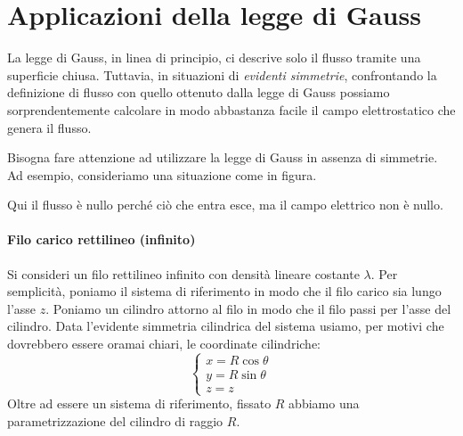 \section{Applicazioni della legge di Gauss}
La legge di Gauss, in linea di principio, ci descrive solo il flusso tramite una superficie chiusa. Tuttavia, in situazioni di \textit{evidenti simmetrie}, confrontando la definizione di flusso con quello ottenuto dalla legge di Gauss possiamo sorprendentemente calcolare in modo abbastanza facile il campo elettrostatico che genera il flusso.
\begin{attention} %
	Bisogna fare attenzione ad utilizzare la legge di Gauss in assenza di simmetrie. Ad esempio, consideriamo una situazione come in figura.
	
	Qui il flusso è nullo perché ciò che entra esce, ma il campo elettrico non è nullo.
\end{attention}
\paragraph{Filo carico rettilineo (infinito)}
	Si consideri un filo rettilineo infinito con densità lineare costante $\lambda$. Per semplicità, poniamo il sistema di riferimento in modo che il filo carico sia lungo l'asse $z$. Poniamo un cilindro attorno al filo in modo che il filo passi per l'asse del cilindro. Data l'evidente simmetria cilindrica del sistema usiamo, per motivi che dovrebbero essere oramai chiari, le coordinate cilindriche:
\begin{equation*}
	\begin{cases}
		x=R\cos\theta\\
		y=R\sin\theta\\
		z=z
	\end{cases}
\end{equation*}
Oltre ad essere un sistema di riferimento, fissato $R$ abbiamo una parametrizzazione del cilindro di raggio $R$.

